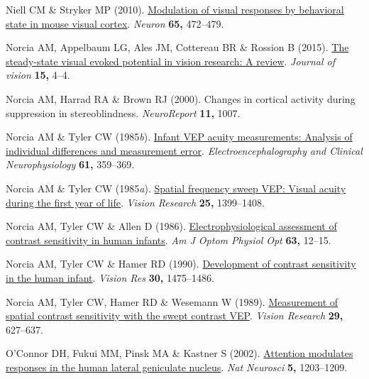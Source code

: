 \documentclass[
  letterpaper,
  DIV=11,
  numbers=noendperiod]{scrartcl}
\newlength{\cslhangindent}
\newenvironment{CSLReferences}[2] %
 {\begin{list}{}{%
  \setlength{\itemindent}{0pt}
  \setlength{\leftmargin}{0pt}
  \setlength{\parsep}{0pt}
  \ifodd #1
   \setlength{\leftmargin}{\cslhangindent}
   \setlength{\itemindent}{-1\cslhangindent}
  \fi
  \setlength{\itemsep}{#2\baselineskip}}}
 {\end{list}}
\begin{document}
\begin{CSLReferences}{1}{1}
Niell CM \& Stryker MP (2010).
\href{https://doi.org/10.1016/j.neuron.2010.01.033}{Modulation of visual
responses by behavioral state in mouse visual cortex}. \emph{Neuron}
\textbf{65,} 472--479.

Norcia AM, Appelbaum LG, Ales JM, Cottereau BR \& Rossion B (2015).
\href{https://doi.org/10.1167/15.6.4}{The steady-state visual evoked
potential in vision research: {A} review}. \emph{Journal of vision}
\textbf{15,} 4--4.

Norcia AM, Harrad RA \& Brown RJ (2000). Changes in cortical activity
during suppression in stereoblindness. \emph{NeuroReport} \textbf{11,}
1007.

Norcia AM \& Tyler CW (1985\emph{b}).
\href{https://doi.org/10.1016/0013-4694(85)91026-0}{Infant {VEP} acuity
measurements: Analysis of individual differences and measurement error}.
\emph{Electroencephalography and Clinical Neurophysiology} \textbf{61,}
359--369.

Norcia AM \& Tyler CW (1985\emph{a}).
\href{https://doi.org/10.1016/0042-6989(85)90217-2}{Spatial frequency
sweep {VEP}: Visual acuity during the first year of life}. \emph{Vision
Research} \textbf{25,} 1399--1408.

Norcia AM, Tyler CW \& Allen D (1986).
\href{https://doi.org/10.1097/00006324-198601000-00003}{Electrophysiological
assessment of contrast sensitivity in human infants}. \emph{Am J Optom
Physiol Opt} \textbf{63,} 12--15.

Norcia AM, Tyler CW \& Hamer RD (1990).
\href{https://doi.org/10.1016/0042-6989(90)90028-j}{Development of
contrast sensitivity in the human infant}. \emph{Vision Res}
\textbf{30,} 1475--1486.

Norcia AM, Tyler CW, Hamer RD \& Wesemann W (1989).
\href{https://doi.org/10.1016/0042-6989(89)90048-5}{Measurement of
spatial contrast sensitivity with the swept contrast {VEP}}.
\emph{Vision Research} \textbf{29,} 627--637.

O'Connor DH, Fukui MM, Pinsk MA \& Kastner S (2002).
\href{https://doi.org/10.1038/nn957}{Attention modulates responses in
the human lateral geniculate nucleus}. \emph{Nat Neurosci} \textbf{5,}
1203--1209.


\end{CSLReferences}
\end{document}
